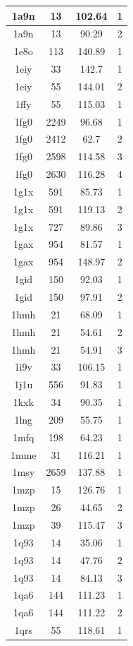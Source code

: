 \begin{center}
\begin{longtable}{c|c|c|c}
1a9n & 13 & 102.64 & 1 \\ \hline
1a9n & 13 & 90.29 & 2 \\ \hline
1e8o & 113 & 140.89 & 1 \\ \hline
1eiy & 33 & 142.7 & 1 \\ \hline
1eiy & 55 & 144.01 & 2 \\ \hline
1ffy & 55 & 115.03 & 1 \\ \hline
1fg0 & 2249 & 96.68 & 1 \\ \hline
1fg0 & 2412 & 62.7 & 2 \\ \hline
1fg0 & 2598 & 114.58 & 3 \\ \hline
1fg0 & 2630 & 116.28 & 4 \\ \hline
1g1x & 591 & 85.73 & 1 \\ \hline
1g1x & 591 & 119.13 & 2 \\ \hline
1g1x & 727 & 89.86 & 3 \\ \hline
1gax & 954 & 81.57 & 1 \\ \hline
1gax & 954 & 148.97 & 2 \\ \hline
1gid & 150 & 92.03 & 1 \\ \hline
1gid & 150 & 97.91 & 2 \\ \hline
1hmh & 21 & 68.09 & 1 \\ \hline
1hmh & 21 & 54.61 & 2 \\ \hline
1hmh & 21 & 54.91 & 3 \\ \hline
1i9v & 33 & 106.15 & 1 \\ \hline
1j1u & 556 & 91.83 & 1 \\ \hline
1kxk & 34 & 90.35 & 1 \\ \hline
1lng & 209 & 55.75 & 1 \\ \hline
1mfq & 198 & 64.23 & 1 \\ \hline
1mme & 31 & 116.21 & 1 \\ \hline
1msy & 2659 & 137.88 & 1 \\ \hline
1mzp & 15 & 126.76 & 1 \\ \hline
1mzp & 26 & 44.65 & 2 \\ \hline
1mzp & 39 & 115.47 & 3 \\ \hline
1q93 & 14 & 35.06 & 1 \\ \hline
1q93 & 14 & 47.76 & 2 \\ \hline
1q93 & 14 & 84.13 & 3 \\ \hline
1qa6 & 144 & 111.23 & 1 \\ \hline
1qa6 & 144 & 111.22 & 2 \\ \hline
1qrs & 55 & 118.61 & 1 \\ \hline

\end{longtable}
\end{center}
